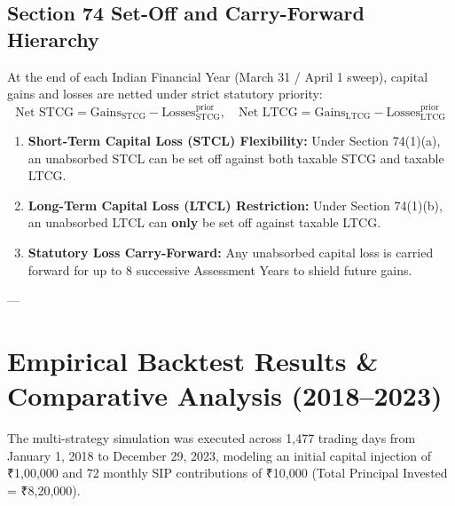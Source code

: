 \documentclass[11pt,a4paper]{article}
\begin{document}
\subsection{Section 74 Set-Off and Carry-Forward Hierarchy}
At the end of each Indian Financial Year (March 31 / April 1 sweep), capital gains and losses are netted under strict statutory priority:
\begin{equation}
\text{Net STCG} = \text{Gains}_{\text{STCG}} - \text{Losses}_{\text{STCG}}^{\text{prior}}, \quad \text{Net LTCG} = \text{Gains}_{\text{LTCG}} - \text{Losses}_{\text{LTCG}}^{\text{prior}}
\end{equation}
\begin{enumerate}
    \item \textbf{Short-Term Capital Loss (STCL) Flexibility:} Under Section 74(1)(a), an unabsorbed STCL can be set off against both taxable STCG and taxable LTCG.
    \item \textbf{Long-Term Capital Loss (LTCL) Restriction:} Under Section 74(1)(b), an unabsorbed LTCL can \textbf{only} be set off against taxable LTCG.
    \item \textbf{Statutory Loss Carry-Forward:} Any unabsorbed capital loss is carried forward for up to 8 successive Assessment Years to shield future gains.
\end{enumerate}

---

\section{Empirical Backtest Results \& Comparative Analysis (2018--2023)}

The multi-strategy simulation was executed across 1,477 trading days from January 1, 2018 to December 29, 2023, modeling an initial capital injection of ₹1,00,000 and 72 monthly SIP contributions of ₹10,000 (Total Principal Invested = ₹8,20,000).
\end{document}
